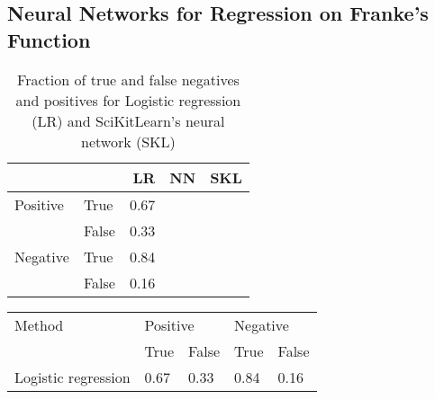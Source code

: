\subsection{Neural Networks for Regression on Franke's Function}


\begin{table}[htbp]

\caption{Fraction of true and false negatives and positives for Logistic regression (LR) and SciKitLearn's neural network (SKL)}
	\begin{tabular}{l  l  r  r  r}
		 & & \textbf{LR} & \textbf{NN} & \textbf{SKL} \\
		 \hline
		Positive & True & 0.67 & & \\
		 & False & 0.33 & & \\
		 \hline
		Negative & True & 0.84 &  & \\
		& False & 0.16 & & \\
	\end{tabular}
\label{tab:confusion}
\end{table}

\begin{table}
	\begin{tabular}{p{15mm} l l l l}
		\toprule
		Method & \multicolumn{2}{l}{Positive} & \multicolumn{2}{l}{Negative} \\
		\cline{2-3} \cline{4-5}
		& True & False & True & False \\
		\midrule
		Logistic regression & 0.67 & 0.33 & 0.84 & 0.16 \\
	\bottomrule
	\end{tabular}
\end{table}


\begin{figure}[htbp]
	\centering
	\caption{}
	\label{fig:}
\end{figure}
